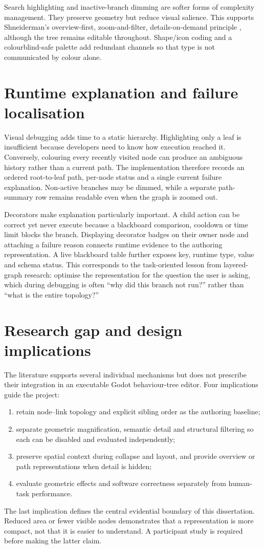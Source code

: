 Search highlighting and inactive-branch dimming are softer forms of complexity management. They preserve geometry but reduce visual salience. This supports Shneiderman's overview-first, zoom-and-filter, details-on-demand principle \parencite{shneiderman1996eyes}, although the tree remains editable throughout. Shape/icon coding and a colourblind-safe palette add redundant channels so that type is not communicated by colour alone.

\section{Runtime explanation and failure localisation}

Visual debugging adds time to a static hierarchy. Highlighting only a leaf is insufficient because developers need to know how execution reached it. Conversely, colouring every recently visited node can produce an ambiguous history rather than a current path. The implementation therefore records an ordered root-to-leaf path, per-node status and a single current failure explanation. Non-active branches may be dimmed, while a separate path-summary row remains readable even when the graph is zoomed out.

Decorators make explanation particularly important. A child action can be correct yet never execute because a blackboard comparison, cooldown or time limit blocks the branch. Displaying decorator badges on their owner node and attaching a failure reason connects runtime evidence to the authoring representation. A live blackboard table further exposes key, runtime type, value and schema status. This corresponds to the task-oriented lesson from layered-graph research: optimise the representation for the question the user is asking, which during debugging is often ``why did this branch not run?'' rather than ``what is the entire topology?''

\section{Research gap and design implications}

The literature supports several individual mechanisms but does not prescribe their integration in an executable Godot behaviour-tree editor. Four implications guide the project:

\begin{enumerate}
    \item retain node--link topology and explicit sibling order as the authoring baseline;
    \item separate geometric magnification, semantic detail and structural filtering so each can be disabled and evaluated independently;
    \item preserve spatial context during collapse and layout, and provide overview or path representations when detail is hidden;
    \item evaluate geometric effects and software correctness separately from human-task performance.
\end{enumerate}

The last implication defines the central evidential boundary of this dissertation. Reduced area or fewer visible nodes demonstrates that a representation is more compact, not that it is easier to understand. A participant study is required before making the latter claim.
